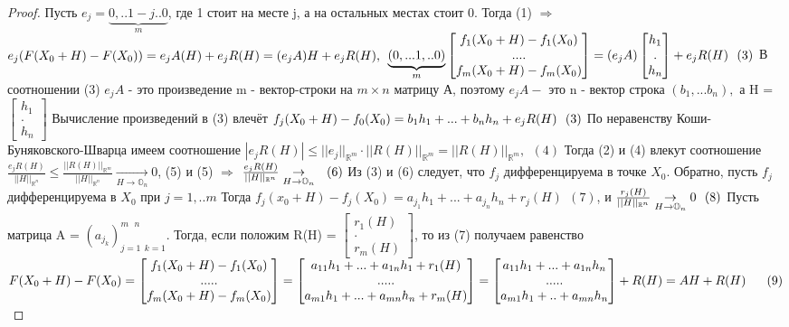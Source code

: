 \begin{proof}
	Пусть $e_j = \underbrace{0,..1 - j..0}_{m}$, где 1 стоит на месте j, а на остальных местах стоит 0. Тогда (1) $\Rightarrow$ $e_j(F(X_0+H)-F(X_0)) = e_jA(H)+e_jR(H)=(e_jA)H + e_jR(H), \\$
	$\underbrace{(0,...1,..0)}_{m}{\begin{bmatrix}  f_1(X_0+H) - f_1(X_0) \\ . . . .  \\ f_m(X_0+ H) - f_m(X_0) \end{bmatrix}} = (e_jA) \begin{bmatrix} h_1 \\ . \\ h_n \end{bmatrix}  + e_jR(H) \ \ (3) \\$
	В соотношении (3) $e_jA$ - это произведение  m - вектор-строки на $m \times n$ матрицу А, поэтому $e_jA - $ это n - вектор строка $(b_1,...b_n),$ а H  =$\begin{bmatrix} h_1 \\ .\\ h_n \end{bmatrix}$ Вычисление произведений в (3) влечёт $f_j(X_0 + H)-f_0(X_0) = b_1h_1+...+b_nh_n + e_jR(H) \ \ (3) \\$
	По неравенству Коши-Буняковского-Шварца имеем соотношение $|e_jR(H)| \leq ||e_j||_{\mathbb{R}^m} \cdot ||R(H)||_{\mathbb{R}^m}=||R(H)||_{\mathbb{R}^m}, \ \ (4)$ Тогда (2) и (4) влекут соотношение $\frac{e_jR(H)}{||H||_{\mathbb{R}^n}} \leq \frac{||R(H)||_{\mathbb{R}^m}}{||H||_{\mathbb{R}^n}} \underset{H \to \mathbb{O}_n}{\to} 0$, (5) и (5) $\Rightarrow$ $\frac{e_jR(H)}{||H||_{\mathbb{R}^n}} \underset{H \to \mathbb{O}_n}{\to} \ \ (6) \\ $
	Из (3) и (6) следует, что $f_j$ дифференцируема в точке $X_0$. Обратно, пусть $f_j$ дифференцируема в $X_0$ при $ j = 1,..m$ Тогда $f_j(x_0+H)-f_j(X_0) = a_{j_1}h_1+...+a_{j_n}h_n +r_j(H) \ \ (7)$, и $\frac{r_j(H)}{||H||_{\mathbb{R}^n}} \underset{H \to \mathbb{O}_n}{\to} 0 \ \ (8) \\$
	Пусть матрица A = $(a_{j_k})_{j =1 \ \ k = 1}^{m \ \ \ n}$. Тогда, если положим R(H) = 
	$\begin{bmatrix}
	r_1(H) \\
	. \\
	r_m(H)
	\end{bmatrix}
	$, то из (7) получаем равенство $F(X_0+H) - F(X_0) = \begin{bmatrix} f_1(X_0+H)-f_1(X_0) \\ . . . .  . \\ f_m(X_0 +H)- f_m(X_0)\end{bmatrix} = \begin{bmatrix} a_{11}h_1 +...+a_{1n}h_1+r_1(H) \\ . . . . . \\ a_{m1}h_1+...+a_{mn}h_n + r_m(H) \end{bmatrix} = \begin{bmatrix} a_{11}h_1 + ... + a_{1n}h_n \\ . . . .  . \\ a_{m1}h_1+..+a_{mn}h_n \end{bmatrix} + R(H) = AH + R(H) \ \  \ \ \ (9) \\$

\end{proof}
